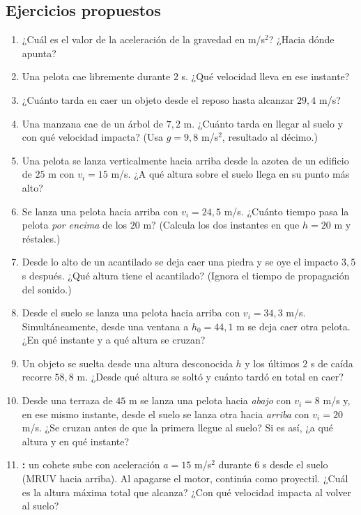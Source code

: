 \documentclass[12pt, letterpaper]{article}
\begin{document}
\subsection{Ejercicios propuestos}

\begin{enumerate}[leftmargin=*, resume]
  \item \facil{} ¿Cuál es el valor de la aceleración de la gravedad en m/s$^2$? ¿Hacia dónde apunta?

  \item \facil{} Una pelota cae libremente durante $2$ s. ¿Qué velocidad lleva en ese instante?

  \item \facil{} ¿Cuánto tarda en caer un objeto desde el reposo hasta alcanzar $29{,}4$ m/s?

  \item \medio{} Una manzana cae de un árbol de $7{,}2$ m. ¿Cuánto tarda en llegar al suelo y con qué velocidad impacta? (Usa $g = 9{,}8$ m/s$^2$, resultado al décimo.)

  \item \medio{} Una pelota se lanza verticalmente hacia arriba desde la azotea de un edificio de $25$ m con $v_i = 15$ m/s. ¿A qué altura sobre el suelo llega en su punto más alto?

  \item \medio{} Se lanza una pelota hacia arriba con $v_i = 24{,}5$ m/s. ¿Cuánto tiempo pasa la pelota \emph{por encima} de los $20$ m? (Calcula los dos instantes en que $h = 20$ m y réstales.)

  \item \medio{} Desde lo alto de un acantilado se deja caer una piedra y se oye el impacto $3{,}5$ s después. ¿Qué altura tiene el acantilado? (Ignora el tiempo de propagación del sonido.)

  \item \dificil{} Desde el suelo se lanza una pelota hacia arriba con $v_i = 34{,}3$ m/s. Simultáneamente, desde una ventana a $h_0 = 44{,}1$ m se deja caer otra pelota. ¿En qué instante y a qué altura se cruzan?

  \item \dificil{} Un objeto se suelta desde una altura desconocida $h$ y los últimos $2$ s de caída recorre $58{,}8$ m. ¿Desde qué altura se soltó y cuánto tardó en total en caer?

  \item \dificil{} Desde una terraza de $45$ m se lanza una pelota hacia \emph{abajo} con $v_i = 8$ m/s y, en ese mismo instante, desde el suelo se lanza otra hacia \emph{arriba} con $v_i = 20$ m/s. ¿Se cruzan antes de que la primera llegue al suelo? Si es así, ¿a qué altura y en qué instante?

  \item \dificil{} \textbf{:} un cohete sube con aceleración $a = 15$ m/s$^2$ durante $6$ s desde el suelo (MRUV hacia arriba). Al apagarse el motor, continúa como proyectil. ¿Cuál es la altura máxima total que alcanza? ¿Con qué velocidad impacta al volver al suelo?
\end{enumerate}
\end{document}
